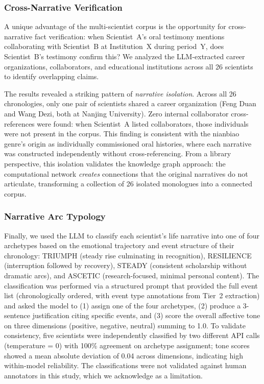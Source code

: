 \documentclass[review]{elsarticle}
\begin{document}
\subsubsection{Cross-Narrative Verification}

A unique advantage of the multi-scientist corpus is the opportunity for cross-narrative fact verification: when Scientist~A's oral testimony mentions collaborating with Scientist~B at Institution~X during period~Y, does Scientist~B's testimony confirm this? We analyzed the LLM-extracted career organizations, collaborators, and educational institutions across all 26 scientists to identify overlapping claims.

The results revealed a striking pattern of \textit{narrative isolation}. Across all 26 chronologies, only one pair of scientists shared a career organization (Feng Duan and Wang Dezi, both at Nanjing University). Zero internal collaborator cross-references were found: when Scientist~A listed collaborators, those individuals were not present in the corpus. This finding is consistent with the nianbiao genre's origin as individually commissioned oral histories, where each narrative was constructed independently without cross-referencing. From a library perspective, this isolation validates the knowledge graph approach: the computational network \textit{creates} connections that the original narratives do not articulate, transforming a collection of 26 isolated monologues into a connected corpus.

\subsubsection{Narrative Arc Typology}

Finally, we used the LLM to classify each scientist's life narrative into one of four archetypes based on the emotional trajectory and event structure of their chronology: TRIUMPH (steady rise culminating in recognition), RESILIENCE (interruption followed by recovery), STEADY (consistent scholarship without dramatic arcs), and ASCETIC (research-focused, minimal personal content). The classification was performed via a structured prompt that provided the full event list (chronologically ordered, with event type annotations from Tier~2 extraction) and asked the model to (1) assign one of the four archetypes, (2) produce a 3-sentence justification citing specific events, and (3) score the overall affective tone on three dimensions (positive, negative, neutral) summing to 1.0. To validate consistency, five scientists were independently classified by two different API calls (temperature = 0) with 100\% agreement on archetype assignment; tone scores showed a mean absolute deviation of 0.04 across dimensions, indicating high within-model reliability. The classifications were not validated against human annotators in this study, which we acknowledge as a limitation.
\end{document}
